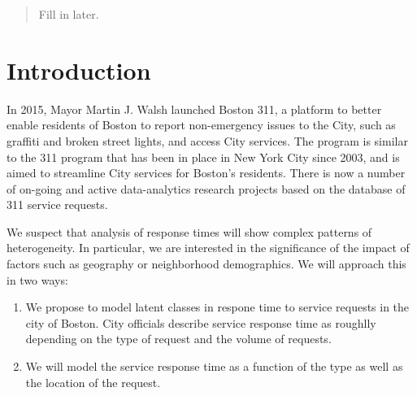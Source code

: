 \documentclass[twoside]{article}
\theoremstyle{theorem}
\theoremstyle{theorem}
\theoremstyle{theorem}
\theoremstyle{lemma}
\theoremstyle{definition}
\theoremstyle{example}
\begin{document}

\makeatletter
\def\BState{\State\hskip-\ALG@thistlm}
\makeatother
%

%


\begin{abstract}
Fill in later.
\end{abstract}

\section{Introduction}

In 2015, Mayor Martin J. Walsh launched Boston 311, a platform to better enable residents of Boston to report non-emergency issues to the City, such as graffiti and broken street lights, and access City services. The program is similar to the 311 program that has been in place in New York City since 2003, and is aimed to streamline City services for Boston's residents. There is now a number of on-going and active data-analytics research projects based on the database of 311 service requests.

We suspect that analysis of response times will show complex patterns of heterogeneity. In particular, we are interested in the significance of the impact of  factors such as geography or neighborhood demographics. We will approach this in two ways:
\begin{enumerate}
\item We propose to model latent classes in respone time to service requests in the city of Boston. City officials describe service response time as roughlly depending on the type of request and the volume of requests.  
\item We will model the service response time as a function of the type as well as the location of the request.
\end{enumerate}
\end{document}
